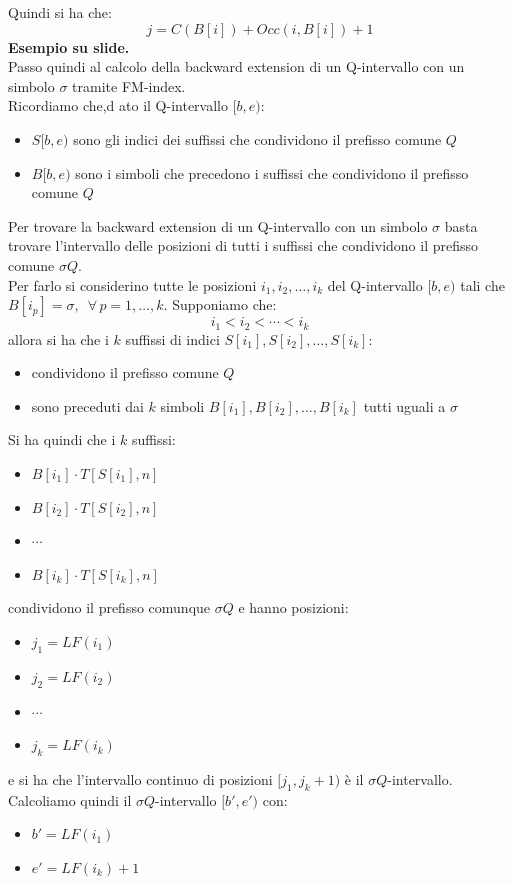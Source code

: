 \documentclass[a4paper,12pt, oneside]{book}
\begin{document}
Quindi si ha che:
\[j=C(B[i])+Occ(i,B[i])+1\]
\textbf{Esempio su slide.}\\
Passo quindi al calcolo della backward extension di un Q-intervallo con un
simbolo $\sigma$ tramite FM-index.\\
Ricordiamo che,d ato il Q-intervallo $[b,e)$:
\begin{itemize}
  \item $S[b,e)$ sono gli indici dei suffissi che condividono il prefisso comune
  $Q$
  \item $B[b,e)$ sono i simboli che precedono i suffissi che condividono il
  prefisso comune $Q$
\end{itemize}
Per trovare la backward extension di un Q-intervallo con un simbolo $\sigma$
basta trovare l'intervallo delle posizioni di tutti i suffissi che condividono
il prefisso comune $\sigma Q$.\\
Per farlo si considerino tutte le posizioni $i_1,i_2,\ldots, i_k$ del
Q-intervallo $[b,e)$ tali che
$B[i_p]=\sigma,\,\,\,\forall\,p=1,\ldots,k$. Supponiamo che:
\[i_1<i_2<\cdots<i_k\]
allora si ha che i $k$ suffissi di indici $S[i_1],S[i_2],\ldots,S[i_k]$:
\begin{itemize}
  \item condividono il prefisso comune $Q$
  \item sono preceduti dai $k$ simboli $B[i_1],B[i_2],\ldots,B[i_k]$ tutti
  uguali a $\sigma$
\end{itemize}
Si ha quindi che i $k$ suffissi:
\begin{itemize}
  \item $B[i_1]\cdot T[S[i_1],n]$
  \item $B[i_2]\cdot T[S[i_2],n]$
  \item $\cdots$
  \item $B[i_k]\cdot T[S[i_k],n]$
\end{itemize}
condividono il prefisso comunque $\sigma Q$ e hanno posizioni:
\begin{itemize}
  \item $j_1=LF(i_1)$
  \item $j_2=LF(i_2)$
  \item $\cdots$
  \item $j_k=LF(i_k)$
\end{itemize}
e si ha che l'intervallo continuo di posizioni $[j_1,j_k+1)$ è il $\sigma
Q$-intervallo.\\
Calcoliamo quindi il $\sigma Q$-intervallo $[b',e')$ con:
\begin{itemize}
  \item $b'=LF(i_1)$
  \item $e'=LF(i_k)+1$
\end{itemize}
\end{document}
